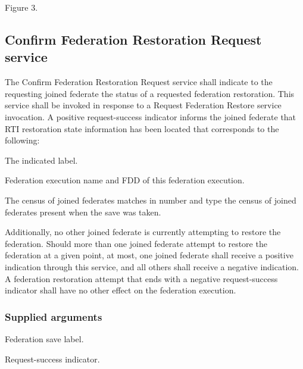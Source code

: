 \begin{stdalphalist}
    \item Figure 3.
\end{stdalphalist}

\clearpage


\subsection{Confirm Federation Restoration Request \rtiinitiated{} service}

The Confirm Federation Restoration Request \rtiinitiated{} service shall indicate to the requesting joined federate the status of a requested federation restoration. This service shall be invoked in response to a Request Federation Restore service invocation. A positive request-success indicator informs the joined federate that RTI restoration state information has been located that corresponds to the following:

\begin{stddashlist}
    \item The indicated label.
    \item Federation execution name and FDD of this federation execution.
    \item The census of joined federates matches in number and type the census of joined federates present when the save was taken.
\end{stddashlist}

Additionally, no other joined federate is currently attempting to restore the federation. Should more than one joined federate attempt to restore the federation at a given point, at most, one joined federate shall receive a positive indication through this service, and all others shall receive a negative indication. A federation restoration attempt that ends with a negative request-success indicator shall have no other effect on the federation execution.

\subsubsection{Supplied arguments}

\begin{stdalphalist}
    \item Federation save label.
    \item Request-success indicator.
\end{stdalphalist}

